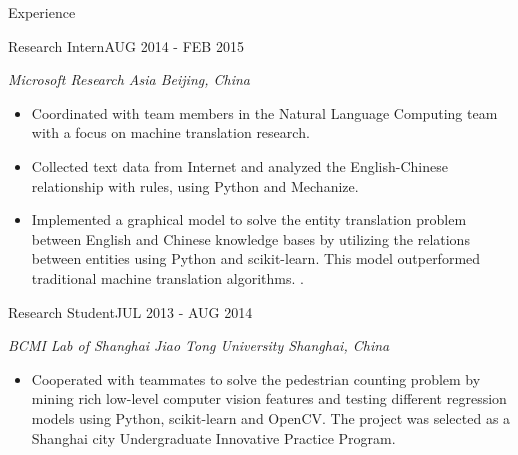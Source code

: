 \documentclass{resume} %
\begin{document}
\begin{rSection}{Experience}
\begin{rSubsection}{Research Intern}{AUG 2014 - FEB 2015}{}

{\em Microsoft Research Asia \hfill Beijing, China}

\begin{itemize}
\item Coordinated with team members in the Natural Language Computing team with a focus on machine translation research.
\item Collected text data from Internet and analyzed the English-Chinese relationship with rules, using Python and Mechanize.
\item Implemented a graphical model to solve the entity translation problem between English and Chinese knowledge bases by utilizing the relations between entities using Python and scikit-learn. This model outperformed traditional machine translation algorithms. .
\end{itemize}
\end{rSubsection}
\vspace{5pt}
\begin{rSubsection}{Research Student}{JUL 2013 - AUG 2014}{}
	
{\em BCMI Lab of Shanghai Jiao Tong University \hfill Shanghai, China}

\begin{itemize}
\item Cooperated with teammates to solve the pedestrian counting problem by mining rich low-level computer vision features and testing different regression models using Python, scikit-learn and OpenCV. The project was selected as a Shanghai city Undergraduate Innovative Practice Program.
\end{itemize}
\end{rSubsection}
\end{rSection}
\end{document}

